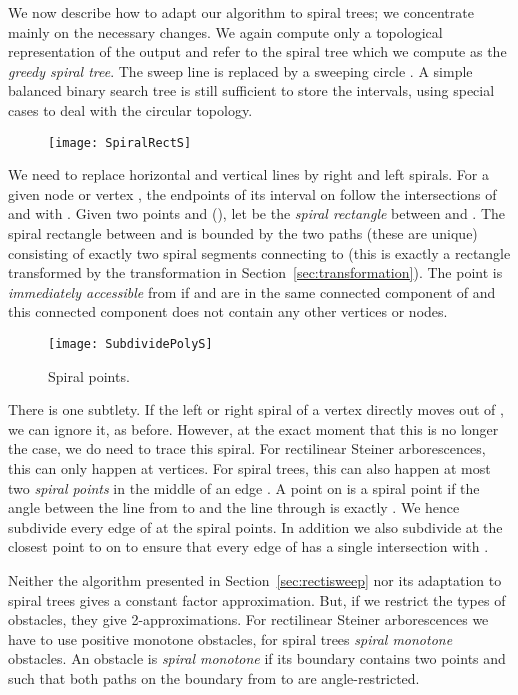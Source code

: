 \documentclass{journalA4}
\begin{document}
We now describe how to adapt our algorithm to spiral trees; we concentrate mainly on the necessary changes.
We again compute only a topological representation of the output and refer to the spiral tree which we compute as the \emph{greedy spiral tree}. The sweep line is replaced by a sweeping circle . A simple balanced binary search tree is still sufficient to store the intervals, using special cases to deal with the circular topology.

\begin{wrapfigure}[6]{r}{.27\textwidth}
  \centering
  \texttt{[image: SpiralRectS]}
\end{wrapfigure}
We need to replace horizontal and vertical lines by right and left spirals. For a given node or vertex , the endpoints of its interval on  follow the intersections
of  and  with . Given two points  and  (), let  be the \emph{spiral rectangle} between 
and . The spiral rectangle between  and  is bounded by the two paths (these are unique) consisting of exactly two spiral segments connecting  to  (this is exactly a
rectangle transformed by the transformation in Section~\ref{sec:transformation}). The point  is \emph{immediately accessible} from  if  and  are in the same connected
component of  and this connected component does not contain any other vertices or nodes.

\begin{wrapfigure}[8]{r}{.27\textwidth}
  \centering
  \texttt{[image: SubdividePolyS]}
  \small{\caption{Spiral points.\label{fig:SubdividePoly}}}
\end{wrapfigure}

There is one subtlety. If the left or right spiral of a vertex  directly moves out of , we can ignore it, as before. However, at the exact moment that this is no longer the case, we do need to trace this spiral. For rectilinear Steiner arborescences, this can only happen at vertices. For spiral trees, this can also happen at most two \emph{spiral points} in the middle of an edge . A point  on  is a spiral point if the angle between the line from  to  and the line through  is exactly . We hence subdivide every edge of  at the spiral points. In addition we also subdivide  at the closest point to  on  to ensure that every edge of  has a single intersection with .

Neither the algorithm presented in Section~\ref{sec:rectisweep} nor its adaptation to spiral trees gives a constant factor approximation. But, if we restrict the types of obstacles, they give 2-approximations. For rectilinear Steiner arborescences we have to use positive monotone obstacles, for spiral trees \emph{spiral monotone} obstacles. An obstacle is \emph{spiral monotone} if its boundary contains two points  and  such that both paths on the boundary from  to  are angle-restricted.
\end{document}
